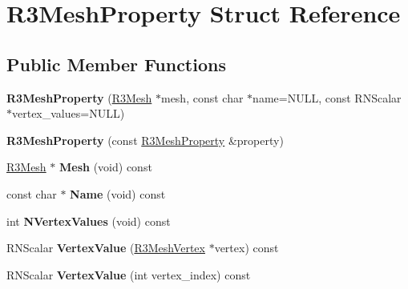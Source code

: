 \hypertarget{struct_r3_mesh_property}{}\section{R3\+Mesh\+Property Struct Reference}
\label{struct_r3_mesh_property}
\subsection*{Public Member Functions}
\begin{DoxyCompactItemize}
\item 
{\bfseries R3\+Mesh\+Property} (\hyperlink{class_r3_mesh}{R3\+Mesh} $\ast$mesh, const char $\ast$name=N\+U\+LL, const R\+N\+Scalar $\ast$vertex\+\_\+values=N\+U\+LL)\hypertarget{struct_r3_mesh_property_a87f23efa3667f4a53c0b80bfe566185f}{}\label{struct_r3_mesh_property_a87f23efa3667f4a53c0b80bfe566185f}

\item 
{\bfseries R3\+Mesh\+Property} (const \hyperlink{struct_r3_mesh_property}{R3\+Mesh\+Property} \&property)\hypertarget{struct_r3_mesh_property_a2f2b3a2f5cf7de521ed17b6a35e364b4}{}\label{struct_r3_mesh_property_a2f2b3a2f5cf7de521ed17b6a35e364b4}

\item 
\hyperlink{class_r3_mesh}{R3\+Mesh} $\ast$ {\bfseries Mesh} (void) const \hypertarget{struct_r3_mesh_property_ae18d51321ae7efd6d59e710476cbc4be}{}\label{struct_r3_mesh_property_ae18d51321ae7efd6d59e710476cbc4be}

\item 
const char $\ast$ {\bfseries Name} (void) const \hypertarget{struct_r3_mesh_property_af7127aea176e098cc13c681e03574817}{}\label{struct_r3_mesh_property_af7127aea176e098cc13c681e03574817}

\item 
int {\bfseries N\+Vertex\+Values} (void) const \hypertarget{struct_r3_mesh_property_ae84e8e68c78fddf209f0c38739bce8ec}{}\label{struct_r3_mesh_property_ae84e8e68c78fddf209f0c38739bce8ec}

\item 
R\+N\+Scalar {\bfseries Vertex\+Value} (\hyperlink{class_r3_mesh_vertex}{R3\+Mesh\+Vertex} $\ast$vertex) const \hypertarget{struct_r3_mesh_property_aa0f6beec858b3636341271958b6e6962}{}\label{struct_r3_mesh_property_aa0f6beec858b3636341271958b6e6962}

\item 
R\+N\+Scalar {\bfseries Vertex\+Value} (int vertex\+\_\+index) const \hypertarget{struct_r3_mesh_property_acd3e1677b4f1cc0500bc99b404e46fa0}{}\label{struct_r3_mesh_property_acd3e1677b4f1cc0500bc99b404e46fa0}


\end{DoxyCompactItemize}
